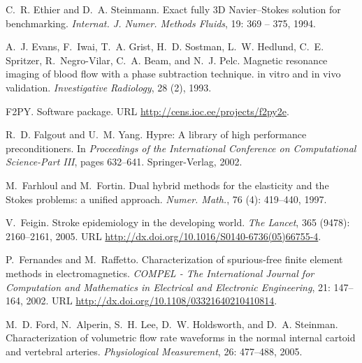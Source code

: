 \begin{thebibliography}{467}
C.~R. Ethier and D.~A. Steinmann.
\newblock Exact fully {3D} {N}avier--{S}tokes solution for benchmarking.
\newblock \emph{Internat. J. Numer. Methods Fluids}, 19: 369 -- 375,
  1994.

A.~J. Evans, F.~Iwai, T.~A. Grist, H.~D. Sostman, L.~W. Hedlund, C.~E.
  Spritzer, R.~Negro-Vilar, C.~A. Beam, and N.~J. Pelc.
\newblock Magnetic resonance imaging of blood flow with a phase subtraction
  technique. in vitro and in vivo validation.
\newblock \emph{Investigative Radiology}, 28 (2), 1993.

{F2PY}.
\newblock Software package.
\newblock URL \url{http://cens.ioc.ee/projects/f2py2e}.

R.~D. Falgout and U.~M. Yang.
\newblock Hypre: {A} library of high performance preconditioners.
\newblock In \emph{Proceedings of the International Conference on Computational
  Science-Part III}, pages 632--641. Springer-Verlag, 2002.

M.~Farhloul and M.~Fortin.
\newblock Dual hybrid methods for the elasticity and the {S}tokes problems: a
  unified approach.
\newblock \emph{Numer. Math.}, 76 (4): 419--440, 1997.

V.~Feigin.
\newblock Stroke epidemiology in the developing world.
\newblock \emph{The Lancet}, 365 (9478): 2160--2161, 2005.
\newblock URL \url{http://dx.doi.org/10.1016/S0140-6736(05)66755-4}.

P.~Fernandes and M.~Raffetto.
\newblock Characterization of spurious-free finite element methods in
  electromagnetics.
\newblock \emph{COMPEL - The International Journal for Computation and
  Mathematics in Electrical and Electronic Engineering}, 21: 147--164,
  2002.
\newblock URL \url{http://dx.doi.org/10.1108/03321640210410814}.

M.~D. Ford, N.~Alperin, S.~H. Lee, D.~W. Holdsworth, and D.~A. Steinman.
\newblock Characterization of volumetric flow rate waveforms in the normal
  internal cartoid and vertebral arteries.
\newblock \emph{Physiological Measurement}, 26: 477--488, 2005.


\end{thebibliography}
